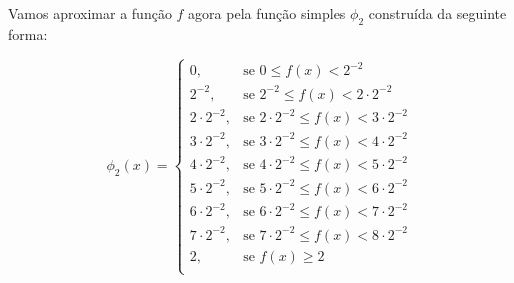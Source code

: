 Vamos aproximar a função $f$ agora pela função simples $\phi_2$ construída da seguinte forma:

$$
\phi_2(x) =\left\{
\begin{array}{ll}
	0, & \textrm{se\ } 0 \leq f(x) < 2^{-2} \\
	2^{-2}, & \textrm{se\ } 2^{-2} \leq f(x) < 2\cdot2^{-2} \\
	2\cdot 2^{-2}, & \textrm{se\ } 2\cdot 2^{-2} \leq f(x) < 3\cdot2^{-2}\\
	3\cdot 2^{-2}, & \textrm{se\ } 3\cdot 2^{-2} \leq f(x) < 4\cdot2^{-2}\\
	4\cdot 2^{-2}, & \textrm{se\ } 4\cdot 2^{-2} \leq f(x) < 5\cdot2^{-2}\\
	5\cdot 2^{-2}, & \textrm{se\ } 5\cdot 2^{-2} \leq f(x) < 6\cdot2^{-2}\\
	6\cdot 2^{-2}, & \textrm{se\ } 6\cdot 2^{-2} \leq f(x) < 7\cdot2^{-2}\\
	7\cdot 2^{-2}, & \textrm{se\ } 7\cdot 2^{-2} \leq f(x) < 8\cdot2^{-2}\\
	2, & \textrm{se\ } f(x) \geq 2\\
\end{array}
\right.
$$

